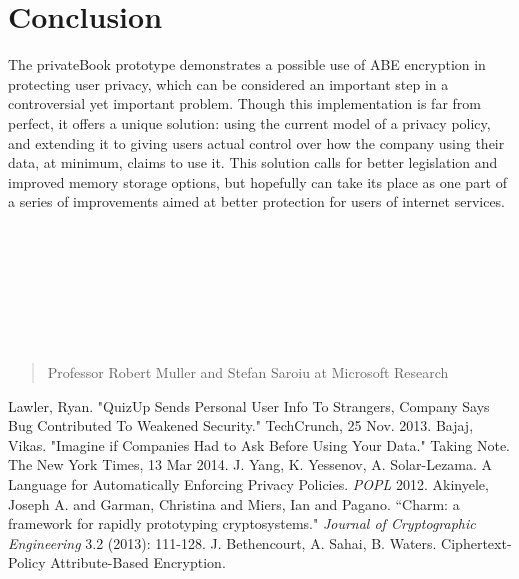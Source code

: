 \documentclass[12pt]{article}
\begin{document}
\section{Conclusion}
The privateBook prototype demonstrates a possible use of ABE encryption in protecting user privacy, which can be considered an important step in a controversial yet important problem. Though this implementation is far from perfect, it offers a unique solution: using the current model of a privacy policy, and extending it to giving users actual control over how the company using their data, at minimum, claims to use it. This solution calls for better legislation and improved memory storage options, but hopefully can take its place as one part of a series of improvements aimed at better protection for users of internet services. \\ \\ \\ \\ \\ \\ \\ \\

\renewcommand{\abstractname}{Acknowledgements}
\begin{abstract}
 Professor Robert Muller and Stefan Saroiu at Microsoft Research
\end{abstract}

\begin{thebibliography}{9}

Lawler, Ryan. "QuizUp Sends Personal User Info To Strangers, Company Says Bug Contributed To Weakened Security." TechCrunch, 25 Nov. 2013.
Bajaj, Vikas. "Imagine if Companies Had to Ask Before Using Your Data." Taking Note. The New York Times, 13 Mar 2014.
J. Yang, K. Yessenov, A. Solar-Lezama. A Language for Automatically Enforcing Privacy Policies. \textit{POPL} 2012.
Akinyele, Joseph A. and Garman, Christina and Miers, Ian and Pagano. ``Charm: a framework for rapidly prototyping cryptosystems." \textit{Journal of Cryptographic Engineering} 3.2 (2013): 111-128.
J. Bethencourt, A. Sahai, B. Waters. Ciphertext-Policy Attribute-Based Encryption.
\end{thebibliography}
\end{document}
